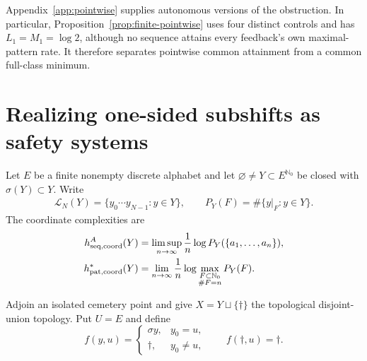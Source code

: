 \documentclass[11pt,reqno]{amsart}
\numberwithin{equation}{section}
\theoremstyle{definition}
\newcommand{\Nzero}{\mathbb N_0}
\newcommand{\Lcal}{\mathcal L}
\begin{document}
Appendix~\ref{app:pointwise} supplies autonomous versions of the
obstruction. In particular, Proposition~\ref{prop:finite-pointwise}
uses four distinct controls and has $L_1=M_1=\log2$, although no
sequence attains every feedback's own maximal-pattern rate. It therefore
separates pointwise common attainment from a common full-class minimum.


\section{Realizing one-sided subshifts as safety systems}\label{sec:realization}

Let $E$ be a finite nonempty discrete alphabet and let
$\varnothing\ne Y\subset E^{\Nzero}$ be closed with $\sigma(Y)\subset Y$.
Write
\begin{align*}
 \Lcal_N(Y)=\{y_0\cdots y_{N-1}:y\in Y\},
 \qquad
 P_Y(F)=\#\{y|_F:y\in Y\}.
\end{align*}
The coordinate complexities are
\begin{align*}
 h_{\rm seq,coord}^A(Y)
 &=\limsup_{n\to\infty}\frac1n
   \log P_Y(\{a_1,\ldots,a_n\}),\\
 h_{\rm pat,coord}^*(Y)
 &=\lim_{n\to\infty}\frac1n
   \log\max_{\substack{F\subset\Nzero\\\#F=n}}P_Y(F).
\end{align*}

Adjoin an isolated cemetery point and give
$X=Y\sqcup\{\dagger\}$ the topological disjoint-union topology.  Put $U=E$
and define
\begin{equation}\label{eq:matching-control}
 f(y,u)=
 \begin{cases}
   \sigma y,&y_0=u,\\
   \dagger,&y_0\ne u,
 \end{cases}
 \qquad
 f(\dagger,u)=\dagger.
\end{equation}
\end{document}

